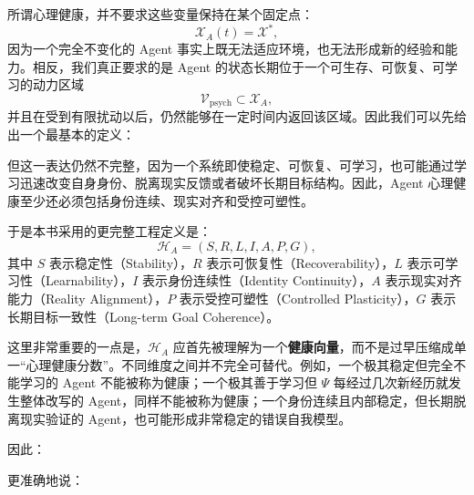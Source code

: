 所谓心理健康，并不要求这些变量保持在某个固定点：
\begin{equation}
\mathcal{X}_A(t)=\mathcal{X}^{*},
\end{equation}
因为一个完全不变化的 Agent 事实上既无法适应环境，也无法形成新的经验和能力。相反，我们真正要求的是 Agent 的状态长期位于一个可生存、可恢复、可学习的动力区域
\begin{equation}
\mathcal{V}_{\mathrm{psych}}
\subset
\mathcal{X}_A,
\end{equation}
并且在受到有限扰动以后，仍然能够在一定时间内返回该区域。因此我们可以先给出一个最基本的定义：
\begin{statementbox}
\centering
{}
\end{statementbox}
但这一表达仍然不完整，因为一个系统即使稳定、可恢复、可学习，也可能通过学习迅速改变自身身份、脱离现实反馈或者破坏长期目标结构。因此，Agent 心理健康至少还必须包括身份连续、现实对齐和受控可塑性。

于是本书采用的更完整工程定义是：
\begin{equation}
\boxed{
\mathcal{H}_A
=
\left(
S,
R,
L,
I,
A,
P,
G
\right),
}
\end{equation}
其中 $S$ 表示稳定性（Stability），$R$ 表示可恢复性（Recoverability），$L$ 表示可学习性（Learnability），$I$ 表示身份连续性（Identity Continuity），$A$ 表示现实对齐能力（Reality Alignment），$P$ 表示受控可塑性（Controlled Plasticity），$G$ 表示长期目标一致性（Long-term Goal Coherence）。

这里非常重要的一点是，$\mathcal{H}_A$ 应首先被理解为一个\textbf{健康向量}，而不是过早压缩成单一“心理健康分数”。不同维度之间并不完全可替代。例如，一个极其稳定但完全不能学习的 Agent 不能被称为健康；一个极其善于学习但 $\Psi$ 每经过几次新经历就发生整体改写的 Agent，同样不能被称为健康；一个身份连续且内部稳定，但长期脱离现实验证的 Agent，也可能形成非常稳定的错误自我模型。

因此：
\begin{statementbox}
\centering
{}
\end{statementbox}
更准确地说：
\begin{statementbox}
\centering
{}
\end{statementbox}


